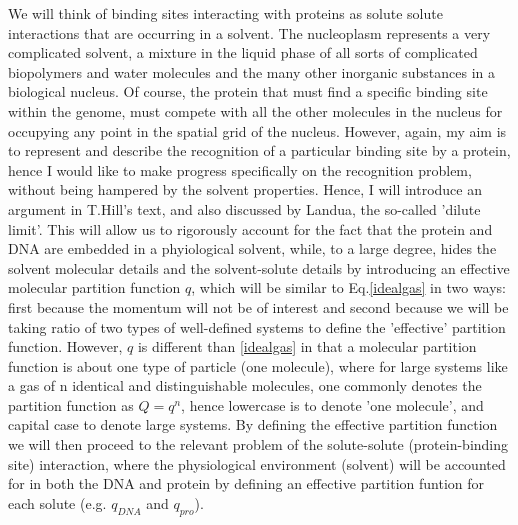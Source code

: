   We will think of binding sites interacting with proteins as solute solute interactions that are occurring in a solvent.  The nucleoplasm represents a very complicated solvent, a mixture in the liquid phase of all sorts of complicated biopolymers and water molecules and the many other inorganic substances in a biological nucleus.  Of course, the protein that must find a specific binding site within the genome, must compete with all the other molecules in the nucleus for occupying any point in the spatial grid of the nucleus.  However, again, my aim is to represent and describe the recognition of a particular binding site by a protein, hence I would like to make progress specifically on the recognition problem, without being hampered by the solvent properties.  Hence, I will introduce an argument in T.Hill's text\cite{hill}, and also discussed by Landua\cite{landaumech}, the so-called 'dilute limit'.  This will allow us to rigorously account for the fact that the protein and DNA are embedded in a phyiological solvent, while, to a large degree, hides the solvent molecular details and the solvent-solute details by introducing an effective molecular partition function $q$, which will be similar to Eq.\ref{idealgas} in two ways: first because the momentum will not be of interest and second because we will be taking ratio of two types of well-defined systems to define the 'effective' partition function.  However, $q$ is different than \ref{idealgas} in that a molecular partition function is about one type of particle (one molecule), where for large systems like a gas of n identical and distinguishable molecules, one commonly denotes the partition function as $Q=q^n$, hence lowercase is to denote 'one molecule', and capital case to denote large systems.  By defining the effective partition function we will then proceed to the relevant problem of the solute-solute (protein-binding site) interaction, where the physiological environment (solvent) will be accounted for in both the DNA and protein by defining an effective partition funtion for each solute (e.g. $q_{DNA}$ and $q_{pro}$).
 
